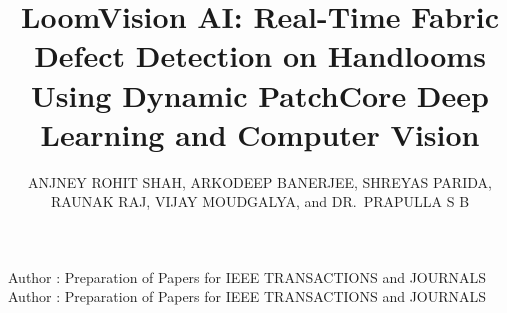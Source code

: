 \documentclass{ieeeaccess}
\begin{document}

\title{LoomVision AI: Real-Time Fabric Defect Detection on Handlooms Using Dynamic PatchCore Deep Learning and Computer Vision}

\author{\uppercase{Anjney Rohit Shah},
\uppercase{Arkodeep Banerjee},
\uppercase{Shreyas Parida},
\uppercase{Raunak Raj},
\uppercase{Vijay Moudgalya}, and
\uppercase{Dr.~Prapulla S B}}

\address[1]{Computer Science and Engineering Dept., RV College of Engineering, Bengaluru, India (e-mail: Anjneyrohitshah.cs25@rvce.edu.in, Arkodeepb.cd25@rvce.edu.in, raunakraj.cs25@rvce.edu.in, prapullasb@rvce.edu.in)}
\address[2]{Mechanical Engineering Dept., RV College of Engineering, Bengaluru, India (e-mail: Shreyasparida.me25@rvce.edu.in, Sprashanthvm.me25@rvce.edu.in)}



\markboth
{Author \headeretal: Preparation of Papers for IEEE TRANSACTIONS and JOURNALS}
{Author \headeretal: Preparation of Papers for IEEE TRANSACTIONS and JOURNALS}
\end{document}
